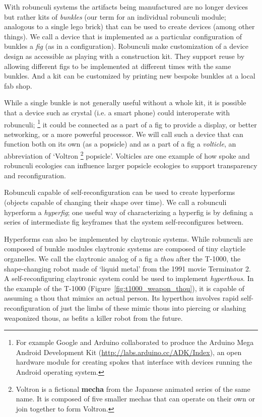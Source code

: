 With robunculi systems the artifacts being manufactured are no longer devices but rather kits of \emph{bunkles} (our term for an individual robunculi module; analogous to a single lego brick) that can be used to create devices (among other things). We call a device that is implemented as a particular configuration of bunkles a \emph{fig} (as in a configuration). Robunculi make customization of a device design as accessible as playing with a construction kit. They support reuse by allowing different figs to be implemented at different times with the same bunkles. And a kit can be customized by printing new bespoke bunkles at a local fab shop.

While a single bunkle is not generally useful without a whole kit, it is possible that a device such as crystal (i.e. a smart phone) could interoperate with robunculi;%
\footnote{For example Google and Arduino collaborated to produce the Arduino Mega Android Development Kit (\url{http://labs.arduino.cc/ADK/Index}), an open hardware module for creating spokes that interface with devices running the Android operating system.}
it could be connected as a part of a fig to provide a display, or better networking, or a more powerful processor.
We will call such a device that can function both on its own (as a popsicle) and as a part of a fig a \emph{volticle}, an abbreviation of `Voltron%
\footnote{Voltron is a fictional \textbf{mecha} from the Japanese animated series of the same name. It is composed of five smaller mechas that can operate on their own or join together to form Voltron.}
popsicle'.
Volticles are one example of how spoke and robunculi ecologies can influence larger popsicle ecologies to support transparency and reconfiguration.

Robunculi capable of self-reconfiguration can be used to create hyperforms (objects capable of changing their shape over time). We call a robunculi hyperform a \emph{hyperfig}; one useful way of characterizing a hyperfig is by defining a series of intermediate fig keyframes that the system self-reconfigures between. 

Hyperforms can also be implemented by claytronic systems. While robunculi are composed of bunkle modules claytronic systems are composed of tiny clayticle organelles. We call the claytronic analog of a fig a \emph{thou} after the T-1000, the shape-changing robot made of `liquid metal' from the 1991 movie Terminator 2. A self-reconfiguring claytronic system could be used to implement \emph{hyperthous}. In the example of the T-1000 (Figure~\ref{fig:t1000_weapon_thou}), it is capable of assuming a thou that mimics an actual person. Its hyperthou involves rapid self-reconfiguration of just the limbs of these mimic thous into piercing or slashing weaponized thous, as befits a killer robot from the future. 

